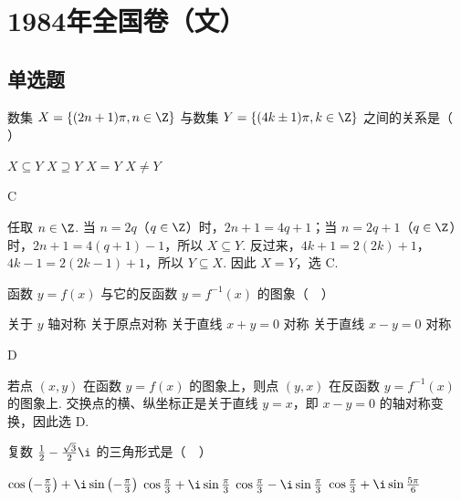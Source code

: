 \documentclass[UTF8,a4paper,oneside,11pt]{ctexbook}
\begin{document}
\mainmatter

\chapter{1984年全国卷（文）}

\section{单选题}

\begin{problem}

数集 \(X = \{(2n + 1)\pi, n\in\Z\}\) 与数集 \(Y = \{(4k \pm 1)\pi, k\in\Z\}\) 之间的关系是（\(\quad\)）

\choices
    {\(X \subseteq Y\)}
    {\(X \supseteq Y\)}
    {\(X = Y\)}
    {\(X \neq Y\)}
\end{problem}

\begin{answer}
C
\end{answer}

\begin{solution}
任取 \(n\in\Z\). 当 \(n=2q\)（\(q\in\Z\)）时，\(2n+1=4q+1\)；当 \(n=2q+1\)（\(q\in\Z\)）时，\(2n+1=4(q+1)-1\)，所以 \(X\subseteq Y\). 反过来，\(4k+1=2(2k)+1\)，\(4k-1=2(2k-1)+1\)，所以 \(Y\subseteq X\). 因此 \(X=Y\)，选 C.
\end{solution}

\begin{problem}

函数 \(y = f(x)\) 与它的反函数 \(y = f^{-1}(x)\) 的图象（\(\quad\)）

\choices
    {关于 \(y\) 轴对称}
    {关于原点对称}
    {关于直线 \(x + y = 0\) 对称}
    {关于直线 \(x - y = 0\) 对称}
\end{problem}

\begin{answer}
D
\end{answer}

\begin{solution}
若点 \((x,y)\) 在函数 \(y=f(x)\) 的图象上，则点 \((y,x)\) 在反函数 \(y=f^{-1}(x)\) 的图象上. 交换点的横、纵坐标正是关于直线 \(y=x\)，即 \(x-y=0\) 的轴对称变换，因此选 D.
\end{solution}

\begin{problem}

复数 \(\frac{1}{2} - \frac{\sqrt{3}}{2}\i\) 的三角形式是（\(\quad\)）

\choices
    {\(\cos \left(-\frac{\pi}{3}\right) + \i\sin \left(-\frac{\pi}{3}\right)\)}
    {\(\cos \frac{\pi}{3} + \i\sin \frac{\pi}{3}\)}
    {\(\cos \frac{\pi}{3} - \i\sin \frac{\pi}{3}\)}
    {\(\cos \frac{\pi}{3} + \i\sin \frac{5\pi}{6}\)}
\end{problem}
\end{document}

